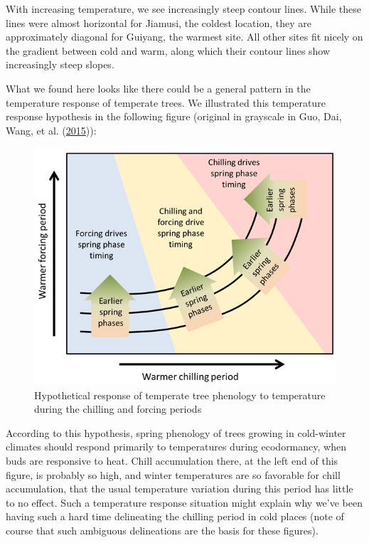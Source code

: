 \documentclass[
]{book}
\begin{document}
With increasing temperature, we see increasingly steep contour lines. While these lines were almost horizontal for Jiamusi, the coldest location, they are approximately diagonal for Guiyang, the warmest site. All other sites fit nicely on the gradient between cold and warm, along which their contour lines show increasingly steep slopes.

What we found here looks like there could be a general pattern in the temperature response of temperate trees. We illustrated this temperature response hypothesis in the following figure (original in grayscale in Guo, Dai, Wang, et al. (\protect\hyperlink{ref-guo2015responses}{2015})):

\begin{figure}
\centering
\includegraphics{pictures/temp_response_hypothesis.jpg}
\caption{Hypothetical response of temperate tree phenology to temperature during the chilling and forcing periods}
\end{figure}

According to this hypothesis, spring phenology of trees growing in cold-winter climates should respond primarily to temperatures during ecodormancy, when buds are responsive to heat. Chill accumulation there, at the left end of this figure, is probably so high, and winter temperatures are so favorable for chill accumulation, that the usual temperature variation during this period has little to no effect. Such a temperature response situation might explain why we've been having such a hard time delineating the chilling period in cold places (note of course that such ambiguous delineations are the basis for these figures).
\end{document}
